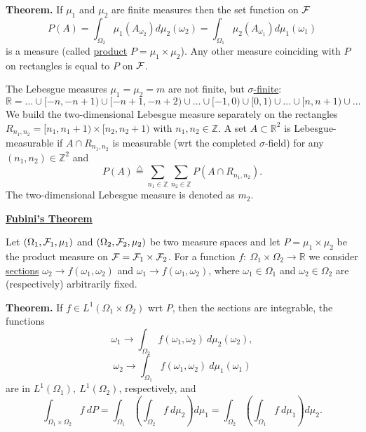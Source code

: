 \documentclass[a4paper,10pt]{article}
\def\ZZ{\mathbb{Z}}
\def\RR{\mathbb{R}}
\newcommand{\1}[1]{\mathbf{1}_{\{#1\}}}
\newcommand{\defi}{\stackrel{\triangle}{=}}
\begin{document}
{\bf Theorem.} If $\mu_1$ and $\mu_2$ are finite measures then the set function on ${\cal F}$
$$P(A)=\int_{\Omega_2}\mu_1(A_{\omega_2})d\mu_2(\omega_2)=\int_{\Omega_1}\mu_2(A_{\omega_1})d\mu_1(\omega_1)$$
is a measure (called \underline{product} $P=\mu_1\times\mu_2$). Any other measure coinciding with $P$ on rectangles is equal to $P$ on ${\cal F}$.\vspace{3mm}

The Lebesgue measures $\mu_1=\mu_2=m$ are not finite, but \underline{$\sigma$-finite}:
  $$\RR=\ldots\cup [-n,-n+1)\cup [-n+1,-n+2)\cup\ldots \cup [-1,0)\cup [0,1)\cup\ldots\cup [n,n+1)\cup\ldots$$
We build the two-dimensional Lebesgue measure separately on the rectangles $R_{n_1,n_2}=[n_1,n_1+1)\times [n_2,n_2+1)$ with $n_1,n_2\in\ZZ$. A set $A\subset\RR^2$ is Lebesgue-measurable if $A\cap R_{n_1,n_2}$ is measurable (wrt the completed $\sigma$-field) for any $(n_1,n_2)\in\ZZ^2$ and
  $$P(A)\defi \sum_{n_1\in\ZZ}\sum_{n_2\in\ZZ} P(A\cap R_{n_1,n_2}).$$
The two-dimensional Lebesgue measure is denoted as $m_2$.\vspace{3mm}

\begin{center}\bf\underline{Fubini's Theorem} \end{center}\vspace{3mm}

Let $(\Omega_1,{\cal F}_1,\mu_1)$ and  $(\Omega_2,{\cal F}_2,\mu_2)$ be two measure spaces and let $P=\mu_1\times\mu_2$ be the product measure on ${\cal F}={\cal F}_1\times{\cal F}_2$. For a function $f:~\Omega_1\times\Omega_2\to\RR$ we consider \underline{sections} $\omega_2\to f(\omega_1,\omega_2)$ and $\omega_1\to f(\omega_1,\omega_2)$, where $\omega_1\in\Omega_1$ and $\omega_2\in\Omega_2$ are (respectively) arbitrarily fixed.  \vspace{3mm}

{\bf Theorem.} If $f\in L^1(\Omega_1\times\Omega_2)$ wrt $P$, then the sections are integrable, the functions
  $$\omega_1\to\int_{\Omega_2} f(\omega_1,\omega_2)~d\mu_2(\omega_2),$$
  $$\omega_2\to\int_{\Omega_1} f(\omega_1,\omega_2)~d\mu_1(\omega_1)$$
are in $L^1(\Omega_1),~L^1(\Omega_2)$, respectively, and
  $$\int_{\Omega_1\times\Omega_2} f~dP=\int_{\Omega_1}\left(\int_{\Omega_2} f~d\mu_2\right)d\mu_1=\int_{\Omega_2}\left(\int_{\Omega_1} f~d\mu_1\right)d\mu_2.$$
\vspace{3mm}
\end{document}
